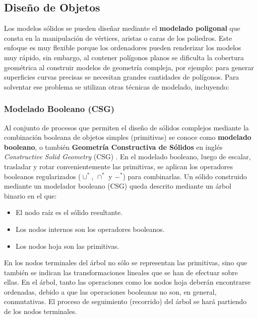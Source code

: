 \subsection{Diseño de Objetos} 
\label{sectionDisenoObjetos}
\label{disGeo}

Los modelos sólidos se pueden diseñar mediante el \textbf{modelado poligonal} \citep{russo2010polygonal} que consta en la manipulación de vértices, aristas o caras de los poliedros. Este enfoque es muy  flexible porque los ordenadores pueden renderizar los modelos muy rápido, sin embargo, al contener polígonos planos se dificulta la cobertura geométrica al construir modelos de geometría compleja, por ejemplo: para generar superficies curvas precisas se necesitan grandes cantidades de polígonos. Para solventar ese problema se utilizan otras técnicas de modelado, incluyendo:

\subsubsection{Modelado Booleano (CSG) }
\label{mod:booleano}
Al conjunto de procesos que permiten el diseño de sólidos complejos mediante la combinación booleana de objetos simples (primitivas) se conoce como \textbf{modelado booleano}, o también  \textbf{Geometría Constructiva de Sólidos} en inglés \textit{Constructive Solid Geometry} (CSG) \citep{foley1996computer}.\newline
En el modelado booleano, luego de escalar, trasladar y rotar convenientemente las primitivas, se aplican los operadores booleanos regularizados  ($\cup^*$, $\cap^*$ y $-^*$) para combinarlas. Un sólido construido mediante un modelador booleano (CSG) queda descrito mediante un árbol binario en el que:

\begin{itemize}
\item El nodo raíz es el sólido resultante.
\item Los nodos internos son los operadores booleanos.
\item Los nodos hoja son las primitivas.
\end{itemize}

En los nodos terminales del árbol no sólo se representan las primitivas, sino que también se indican las transformaciones lineales que se han de efectuar sobre ellas. En el árbol, tanto las operaciones como los nodos hoja deberán encontrarse ordenadas, debido a que las operaciones booleanas no son, en general, conmutativas. El proceso de seguimiento (recorrido) del árbol se hará partiendo de los nodos terminales.

